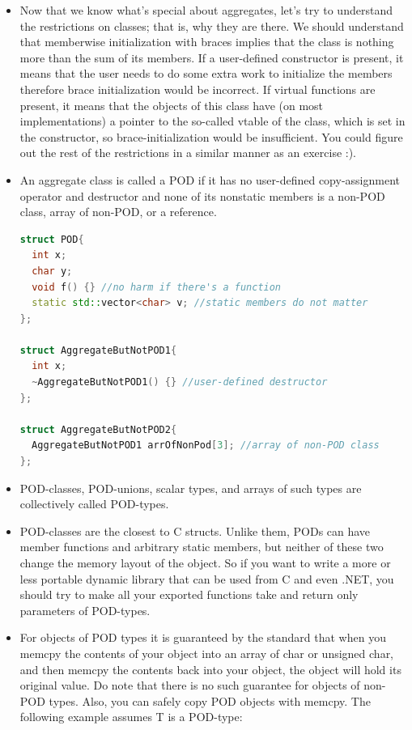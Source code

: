 \documentclass[a4paper,12pt,twoside]{book}
\begin{document}
\begin{itemize}
\item Now that we know what's special about aggregates, let's try to understand the restrictions on classes; that is, why they are there. We should understand that memberwise initialization with braces implies that the class is nothing more than the sum of its members. If a user-defined constructor is present, it means that the user needs to do some extra work to initialize the members therefore brace initialization would be incorrect. If virtual functions are present, it means that the objects of this class have (on most implementations) a pointer to the so-called vtable of the class, which is set in the constructor, so brace-initialization would be insufficient. You could figure out the rest of the restrictions in a similar manner as an exercise :).

\item An aggregate class is called a POD if it has no user-defined copy-assignment operator and destructor and none of its nonstatic members is a non-POD class, array of non-POD, or a reference.

\begin{lstlisting}[frame=single, language=c++]
struct POD{
  int x;
  char y;
  void f() {} //no harm if there's a function
  static std::vector<char> v; //static members do not matter
};

struct AggregateButNotPOD1{
  int x;
  ~AggregateButNotPOD1() {} //user-defined destructor
};

struct AggregateButNotPOD2{
  AggregateButNotPOD1 arrOfNonPod[3]; //array of non-POD class
};
\end{lstlisting}


\item POD-classes, POD-unions, scalar types, and arrays of such types are collectively called POD-types.

\item POD-classes are the closest to C structs. Unlike them, PODs can have member functions and arbitrary static members, but neither of these two change the memory layout of the object. So if you want to write a more or less portable dynamic library that can be used from C and even .NET, you should try to make all your exported functions take and return only parameters of POD-types.

\item For objects of POD types it is guaranteed by the standard that when you memcpy the contents of your object into an array of char or unsigned char, and then memcpy the contents back into your object, the object will hold its original value. Do note that there is no such guarantee for objects of non-POD types. Also, you can safely copy POD objects with memcpy. The following example assumes T is a POD-type:



\end{itemize}
\end{document}
